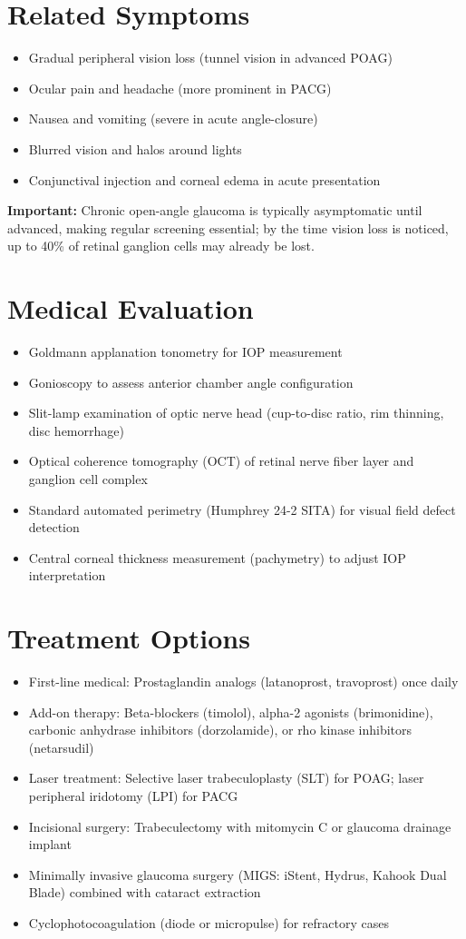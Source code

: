 \section*{Related Symptoms}
\begin{itemize}
  \item Gradual peripheral vision loss (tunnel vision in advanced POAG)
  \item Ocular pain and headache (more prominent in PACG)
  \item Nausea and vomiting (severe in acute angle-closure)
  \item Blurred vision and halos around lights
  \item Conjunctival injection and corneal edema in acute presentation
\end{itemize}
\textbf{Important:} Chronic open-angle glaucoma is typically asymptomatic until advanced, making regular screening essential; by the time vision loss is noticed, up to 40\% of retinal ganglion cells may already be lost.

\section*{Medical Evaluation}
\begin{itemize}
  \item Goldmann applanation tonometry for IOP measurement
  \item Gonioscopy to assess anterior chamber angle configuration
  \item Slit-lamp examination of optic nerve head (cup-to-disc ratio, rim thinning, disc hemorrhage)
  \item Optical coherence tomography (OCT) of retinal nerve fiber layer and ganglion cell complex
  \item Standard automated perimetry (Humphrey 24-2 SITA) for visual field defect detection
  \item Central corneal thickness measurement (pachymetry) to adjust IOP interpretation
\end{itemize}

\section*{Treatment Options}
\begin{itemize}
  \item First-line medical: Prostaglandin analogs (latanoprost, travoprost) once daily
  \item Add-on therapy: Beta-blockers (timolol), alpha-2 agonists (brimonidine), carbonic anhydrase inhibitors (dorzolamide), or rho kinase inhibitors (netarsudil)
  \item Laser treatment: Selective laser trabeculoplasty (SLT) for POAG; laser peripheral iridotomy (LPI) for PACG
  \item Incisional surgery: Trabeculectomy with mitomycin C or glaucoma drainage implant
  \item Minimally invasive glaucoma surgery (MIGS: iStent, Hydrus, Kahook Dual Blade) combined with cataract extraction
  \item Cyclophotocoagulation (diode or micropulse) for refractory cases
\end{itemize}

